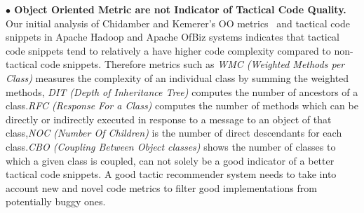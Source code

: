 \documentclass[conference]{IEEEtran}
\begin{document}
\noindent \textbf{$\bullet$ Object Oriented Metric are not Indicator of Tactical Code Quality.}
Our initial analysis of Chidamber and Kemerer's OO metrics~\cite{CK} and tactical code snippets in Apache Hadoop and Apache OfBiz systems indicates that tactical code snippets tend to relatively a have higher code complexity compared to non-tactical code snippets.
Therefore metrics such as  \emph{WMC (Weighted Methods per Class)} measures the complexity of an individual class by summing the weighted methods, \emph{DIT (Depth of Inheritance Tree)} computes the number of ancestors of a class.\emph{RFC (Response For a Class)} computes the number of methods which can be directly or indirectly executed in response to a message to an object of that class,\emph{NOC (Number Of Children)} is the number of direct descendants for each class.\emph{CBO (Coupling Between Object classes)} shows the number of classes to which a given class is coupled, can not solely be a good indicator of a better tactical code snippets. A good tactic recommender system needs to take into account new and novel code metrics to filter good implementations from potentially buggy ones.


















\balance






\end{document}
